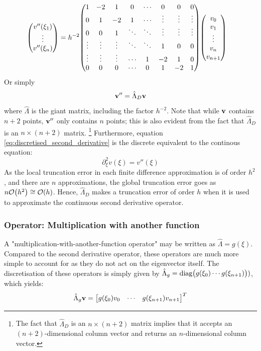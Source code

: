 \documentclass[reprint,english]{revtex4-1}
\begin{document}
\begin{align*}
\mqty(v''(\xi_1)\\\vdots\\v''(\xi_n)) &= h^{-2}
\mqty(1      & -2      & 1       & 0      & \cdots &  0       & 0        & 0      \\
      0      &  1      & -2      & 1      & \cdots &  \vdots  & \vdots   & \vdots \\
      0      &  0      & 1       & \ddots & \ddots &  \vdots  & \vdots   & \vdots \\
      \vdots &  \vdots & \vdots  & \ddots & \ddots &  1       &  0       & 0      \\
      \vdots &  \vdots & \vdots  & \cdots & 1      & -2       &  1       & 0      \\
      0      &  0      & 0       & \cdots & 0      & 1        &  -2      & 1       )
\mqty(v_0\\v_1\\\vdots\\v_n\\v_{n+1})
\end{align*}
Or simply
\begin{equation}\label{eq:discretised_second_derivative}
\vb{v}''=\hat{\Lambda}_D\vb{v}
\end{equation}
where \(\hat{\Lambda}\) is the giant matrix, including the factor \(h^{-2}\). Note that while \(\vb{v}\) contains \(n+2\) points, \(\vb{v}''\) only contains \(n\) points; this is also evident from the fact that \(\hat{\Lambda}_D\) is an \(n\times(n+2)\) matrix. \footnote{The fact that \(\hat{\Lambda}_D\) is an \(n\times(n+2)\) matrix implies that it accepts an \((n+2)\)-dimensional column vector and returns an \(n\)-dimensional column vector.} Furthermore, equation \eqref{eq:discretised_second_derivative} is the discrete equivalent to the continous equation:
\[\partial_\xi^2v(\xi)=v''(\xi)\]
As the local truncation error in each finite difference approximation is of order \(h^2\), and there are \(n\) approximations, the global truncation error goes as \(n\order{h^2}\cong \order{h}\). Hence, \(\hat{\Lambda}_D\) makes a truncation error of order \(h\) when it is used to approximate the continuous second derivative operator.
\newpage
\subsubsection{Operator: Multiplication with another function}
A "multiplication-with-another-function operator" may be written as \(\hat{\Lambda}=g(\xi)\). Compared to the second derivative operator, these operators are much more simple to account for as they do not act on the eigenvector itself. The discretisation of these operators is simply given by \(\hat{\Lambda}_g=\text{diag}\mqty(g(\xi_0)\cdots g(\xi_{n+1})))\), which yields:
\begin{equation}
\hat{\Lambda}_g\vb{v}=\mqty[g(\xi_0)v_0 & \cdots & g(\xi_{n+1})v_{n+1}]^T
\end{equation}
\end{document}
